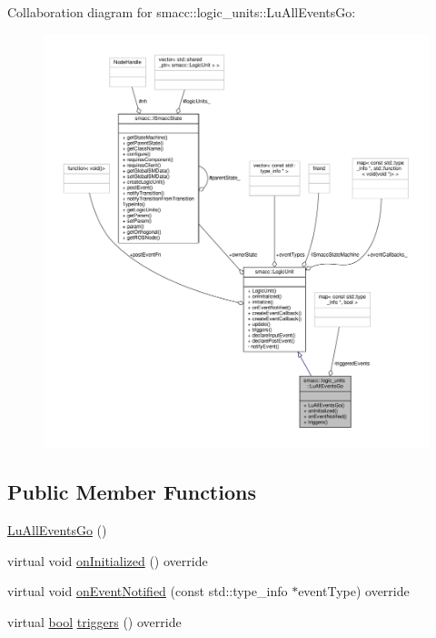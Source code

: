 Collaboration diagram for smacc\+:\+:logic\+\_\+units\+:\+:Lu\+All\+Events\+Go\+:\nopagebreak
\begin{figure}[H]
\begin{center}
\leavevmode
\includegraphics[width=350pt]{classsmacc_1_1logic__units_1_1LuAllEventsGo__coll__graph}
\end{center}
\end{figure}
\subsection*{Public Member Functions}
\begin{DoxyCompactItemize}
\item 
\hyperlink{classsmacc_1_1logic__units_1_1LuAllEventsGo_ab6d024be6f7fad2546f24712e0e100e8}{Lu\+All\+Events\+Go} ()
\item 
virtual void \hyperlink{classsmacc_1_1logic__units_1_1LuAllEventsGo_a01229bb4935f6ebe895b3aeadc187db7}{on\+Initialized} () override
\item 
virtual void \hyperlink{classsmacc_1_1logic__units_1_1LuAllEventsGo_a6c32f39649fabcc01742ca7dcb76acf8}{on\+Event\+Notified} (const std\+::type\+\_\+info $\ast$event\+Type) override
\item 
virtual \hyperlink{classbool}{bool} \hyperlink{classsmacc_1_1logic__units_1_1LuAllEventsGo_a89a25635e1ebb192433267fdbd0530b8}{triggers} () override
\end{DoxyCompactItemize}
